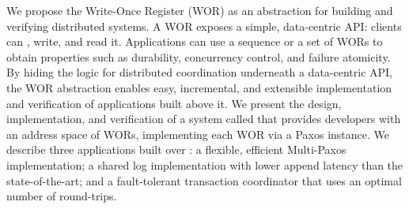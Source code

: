 We propose the Write-Once Register (WOR) as an abstraction for building and verifying distributed systems. 
A WOR exposes a simple, data-centric API: clients can \prepare{}, write, and read it. 
Applications can use a sequence or a set of WORs to obtain properties such as durability, concurrency control, and failure atomicity. 
By hiding the logic for distributed coordination underneath a data-centric API, the WOR abstraction enables easy, incremental, and extensible implementation and verification of applications built above it. 
We present the design, implementation, and verification of a system called \sysname{} that provides developers with an address space of WORs, implementing each WOR via a Paxos instance. 
We describe three applications built over \sysname{}: a flexible, efficient Multi-Paxos implementation; a shared log implementation with lower append latency than the state-of-the-art; and a fault-tolerant transaction coordinator that uses an optimal number of round-trips. 


